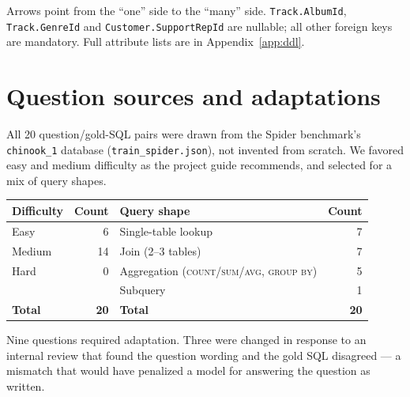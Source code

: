 \documentclass[11pt]{article}
\begin{document}
\noindent
Arrows point from the ``one'' side to the ``many'' side. \texttt{Track.AlbumId},
\texttt{Track.GenreId} and \texttt{Customer.SupportRepId} are nullable; all other foreign keys
are mandatory. Full attribute lists are in Appendix~\ref{app:ddl}.

\section{Question sources and adaptations}\label{sec:questions}

All 20 question/gold-SQL pairs were drawn from the Spider benchmark's \texttt{chinook\_1}
database (\texttt{train\_spider.json}), not invented from scratch. We favored easy and medium
difficulty as the project guide recommends, and selected for a mix of query shapes.

\begin{center}
\begin{tabular}{@{}lr@{\qquad}lr@{}}
\toprule
\textbf{Difficulty} & \textbf{Count} & \textbf{Query shape} & \textbf{Count} \\
\midrule
Easy   & 6  & Single-table lookup       & 7 \\
Medium & 14 & Join (2--3 tables)        & 7 \\
Hard   & 0  & Aggregation (\textsc{count}/\textsc{sum}/\textsc{avg}, \textsc{group by}) & 5 \\
       &    & Subquery                  & 1 \\
\midrule
\textbf{Total} & \textbf{20} & \textbf{Total} & \textbf{20} \\
\bottomrule
\end{tabular}
\end{center}

Nine questions required adaptation. Three were changed in response to an internal review that
found the question wording and the gold SQL disagreed --- a mismatch that would have penalized a
model for answering the question as written.
\end{document}
